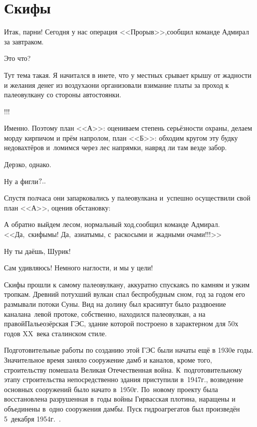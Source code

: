 \chapter{Скифы}
\vepsianrose

\diagdash Итак, парни! Сегодня у нас операция <<Прорыв>>,\mdash сообщил команде Адмирал за завтраком.

\diagdash Это что?

\diagdash Тут тема такая. Я начитался в инете, что у местных срывает крышу от жадности и желания денег из воздуха\mdash они организовали взимание платы за проход к палеовулкану со стороны автостоянки.

\diagdash !!!

\diagdash Именно. Поэтому план <<А>>: оцениваем степень серьёзности охраны, делаем морду кирпичом и прём напролом, план <<Б>>: обходим кругом эту будку недовахтёров и~ломимся через лес напрямки, навряд ли там везде забор.

\diagdash Дерзко, однако.

\diagdash Ну а фигли$\quldots$ %

\newpage

\myldots{}Спустя полчаса они запарковались у палеовулкана и~успешно осуществили свой план <<А>>, оценив обстановку:

\diagdash А обратно выйдем лесом, нормальный ход,\mdash сообщил команде Адмирал.\mdash <<Да,~скифы\mdash мы! Да,~азиаты\mdash мы, с~раскосыми и~жадными очами!!!>>

\diagdash Ну ты даёшь, Шурик!

\diagdash Сам удивляюсь! Немного наглости, и мы у цели! %

Скифы прошли к самому палеовулкану, аккуратно спускаясь по камням и узким тропкам. Древний потухший вулкан спал беспробудным сном, год за годом его размывали потоки Суны. Вид на долину был красив\mdash тут было раздвоение канала\mdash на~левой протоке, собственно, находился палеовулкан, а на правой\mdash Пальеозёрская ГЭС, здание которой построено в характерном для 50\sdash х годов XX~века сталинском стиле.

Подготовительные работы по созданию этой ГЭС были начаты ещё в 1930\sdash е годы. Значительное время заняло сооружение дамб и каналов, кроме того, строительству помешала Великая Отечественная война. К~подготовительному этапу строительства непосредственно здания приступили в~1947\thinspace г., возведение основных сооружений было начато в~1950\thinspace г. По~новому проекту была восстановлена разрушенная в~годы войны Гирвасская плотина, наращены и объединены в~одно сооружения дамбы. Пуск гидроагрегатов был произведён 5~декабря 1954\thinspace г.~\cite{Гидроэлектростанции}.

